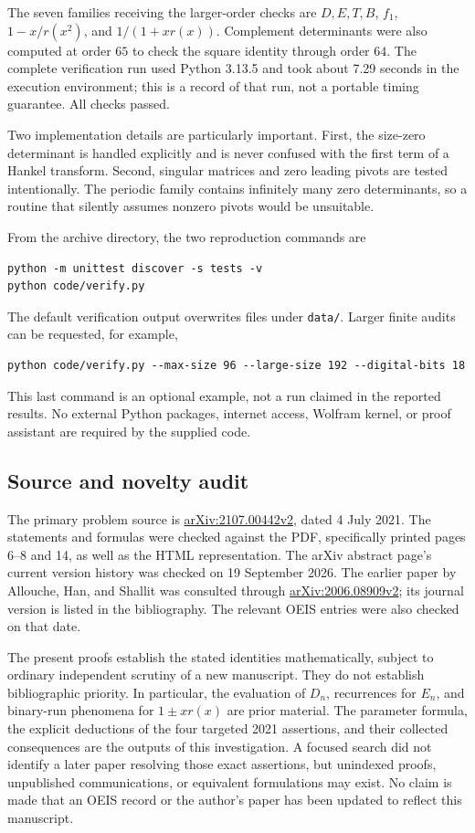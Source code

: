 \documentclass[11pt,a4paper]{article}
\numberwithin{equation}{section}
\theoremstyle{definition}
\theoremstyle{remark}
\newcommand{\arxiv}[1]{\href{https://arxiv.org/abs/#1}{arXiv:#1}}
\begin{document}
The seven families receiving the larger-order checks are $D,E,T,B$,
$f_1$, $1-x/r(x^2)$, and $1/(1+xr(x))$. Complement determinants were
also computed at order $65$ to check the square identity through order
$64$. The complete verification run used Python 3.13.5 and took about
7.29 seconds in the execution environment; this is a record of that run,
not a portable timing guarantee. All checks passed.

Two implementation details are particularly important. First, the
size-zero determinant is handled explicitly and is never confused
with the first term of a Hankel transform. Second, singular matrices
and zero leading pivots are tested intentionally. The periodic family
contains infinitely many zero determinants, so a routine that silently
assumes nonzero pivots would be unsuitable.

From the archive directory, the two reproduction commands are
\begin{lstlisting}[language={}]
python -m unittest discover -s tests -v
python code/verify.py
\end{lstlisting}
The default verification output overwrites files under \texttt{data/}.
Larger finite audits can be requested, for example,
\begin{lstlisting}[language={}]
python code/verify.py --max-size 96 --large-size 192 --digital-bits 18
\end{lstlisting}
This last command is an optional example, not a run claimed in the
reported results. No external Python packages, internet access, Wolfram
kernel, or proof assistant are required by the supplied code.

\subsection{Source and novelty audit}

The primary problem source is \arxiv{2107.00442v2}, dated 4 July 2021.
The statements and formulas were checked against the PDF, specifically
printed pages 6--8 and 14, as well as the HTML representation.
The arXiv abstract page's current version history was checked on
19 September 2026. The earlier paper by Allouche, Han, and
Shallit was consulted through \arxiv{2006.08909v2}; its journal version
is listed in the bibliography. The relevant OEIS entries were also
checked on that date.

The present proofs establish the stated identities mathematically,
subject to ordinary independent scrutiny of a new manuscript. They do
not establish bibliographic priority. In particular, the evaluation of
$D_n$, recurrences for $E_n$, and binary-run phenomena for $1\pm xr(x)$
are prior material. The parameter formula, the explicit deductions of
the four targeted 2021 assertions, and their collected consequences are
the outputs of this investigation. A focused search did not identify a
later paper resolving those exact assertions, but unindexed proofs,
unpublished communications, or equivalent formulations may exist.
No claim is made that an OEIS record or the author's paper has been
updated to reflect this manuscript.
\end{document}
